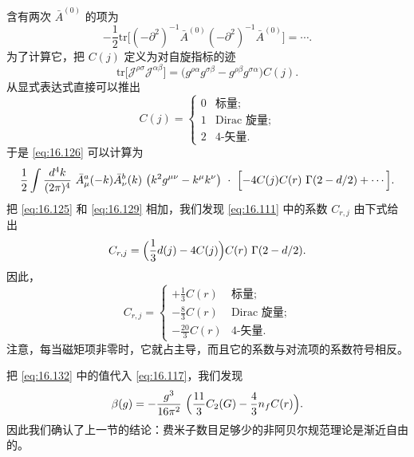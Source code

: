 含有两次 $\bar{A}^{(0)}$ 的项为
\begin{equation}
  -\frac{1}{2}\mathrm{tr}\bigl[ (-\partial^2)^{-1}\bar{A}^{(0)}
    (-\partial^2)^{-1}\bar{A}^{(0)} \bigr] = \cdots .
  \label{eq:16.126}
\end{equation}
为了计算它，把 $C(j)$ 定义为对自旋指标的迹
\begin{equation}
  \mathrm{tr}\bigl[ \mathcal{J}^{\rho\sigma}\mathcal{J}^{\alpha\beta} \bigr]
  = \bigl( g^{\rho\alpha}g^{\sigma\beta} - g^{\rho\beta}g^{\sigma\alpha}
    \bigr)C(j) .
  \label{eq:16.127}
\end{equation}
从显式表达式直接可以推出
\begin{equation}
  C(j) = \begin{cases}
    0 & \text{标量};\\
    1 & \text{Dirac 旋量};\\
    2 & \text{4-矢量}.
  \end{cases}
  \label{eq:16.128}
\end{equation}
于是 \eqref{eq:16.126} 可以计算为
\begin{equation}
  \frac{1}{2}\int \frac{d^4k}{(2\pi)^4}\ \bar{A}^a_\mu(-k)\bar{A}^b_\nu(k)\
    \bigl( k^2g^{\mu\nu} - k^\mu k^\nu \bigr)\ \cdot\
    \Bigl[ -4C(j)C(r)\ \Gamma(2-d/2) + \cdots \Bigr] .
  \label{eq:16.129}
\end{equation}
把 \eqref{eq:16.125} 和 \eqref{eq:16.129} 相加，我们发现 \eqref{eq:16.111} 中的系数 $C_{r,j}$ 由下式给出
\begin{equation}
  C_{r,j} = \Bigl( \frac{1}{3}d(j) - 4C(j) \Bigr)C(r)\ \Gamma(2-d/2) .
  \label{eq:16.131}
\end{equation}
因此，
\begin{equation}
  C_{r,j} = \begin{cases}
    +\frac{1}{3}C(r) & \text{标量};\\
    -\frac{8}{3}C(r) & \text{Dirac 旋量};\\
    -\frac{20}{3}C(r) & \text{4-矢量}.
  \end{cases}
  \label{eq:16.132}
\end{equation}
注意，每当磁矩项非零时，它就占主导，而且它的系数与对流项的系数符号相反。

把 \eqref{eq:16.132} 中的值代入 \eqref{eq:16.117}，我们发现
\begin{equation}
  \beta(g) = -\frac{g^3}{16\pi^2}\ \Bigl( \frac{11}{3}C_2(G)
    - \frac{4}{3}n_fC(r) \Bigr) .
  \label{eq:16.133}
\end{equation}
因此我们确认了上一节的结论：费米子数目足够少的非阿贝尔规范理论是渐近自由的。

